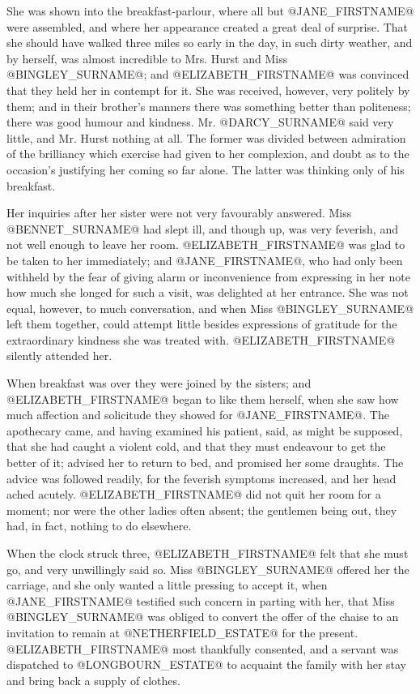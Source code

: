 She was shown into the breakfast-parlour, where all but @JANE_FIRSTNAME@ were
assembled, and where her appearance created a great deal of surprise.
That she should have walked three miles so early in the day, in such
dirty weather, and by herself, was almost incredible to Mrs. Hurst and
Miss @BINGLEY_SURNAME@; and @ELIZABETH_FIRSTNAME@ was convinced that they held her in contempt
for it. She was received, however, very politely by them; and in their
brother's manners there was something better than politeness; there
was good humour and kindness. Mr. @DARCY_SURNAME@ said very little, and Mr.
Hurst nothing at all. The former was divided between admiration of the
brilliancy which exercise had given to her complexion, and doubt as
to the occasion's justifying her coming so far alone. The latter was
thinking only of his breakfast.

Her inquiries after her sister were not very favourably answered. Miss
@BENNET_SURNAME@ had slept ill, and though up, was very feverish, and not
well enough to leave her room. @ELIZABETH_FIRSTNAME@ was glad to be taken to her
immediately; and @JANE_FIRSTNAME@, who had only been withheld by the fear of giving
alarm or inconvenience from expressing in her note how much she longed
for such a visit, was delighted at her entrance. She was not equal,
however, to much conversation, and when Miss @BINGLEY_SURNAME@ left them
together, could attempt little besides expressions of gratitude for the
extraordinary kindness she was treated with. @ELIZABETH_FIRSTNAME@ silently attended
her.

When breakfast was over they were joined by the sisters; and @ELIZABETH_FIRSTNAME@
began to like them herself, when she saw how much affection and
solicitude they showed for @JANE_FIRSTNAME@. The apothecary came, and having
examined his patient, said, as might be supposed, that she had caught
a violent cold, and that they must endeavour to get the better of it;
advised her to return to bed, and promised her some draughts. The advice
was followed readily, for the feverish symptoms increased, and her head
ached acutely. @ELIZABETH_FIRSTNAME@ did not quit her room for a moment; nor were
the other ladies often absent; the gentlemen being out, they had, in
fact, nothing to do elsewhere.

When the clock struck three, @ELIZABETH_FIRSTNAME@ felt that she must go, and very
unwillingly said so. Miss @BINGLEY_SURNAME@ offered her the carriage, and she only
wanted a little pressing to accept it, when @JANE_FIRSTNAME@ testified such concern
in parting with her, that Miss @BINGLEY_SURNAME@ was obliged to convert the offer
of the chaise to an invitation to remain at @NETHERFIELD_ESTATE@ for the present.
@ELIZABETH_FIRSTNAME@ most thankfully consented, and a servant was dispatched to
@LONGBOURN_ESTATE@ to acquaint the family with her stay and bring back a supply
of clothes.



